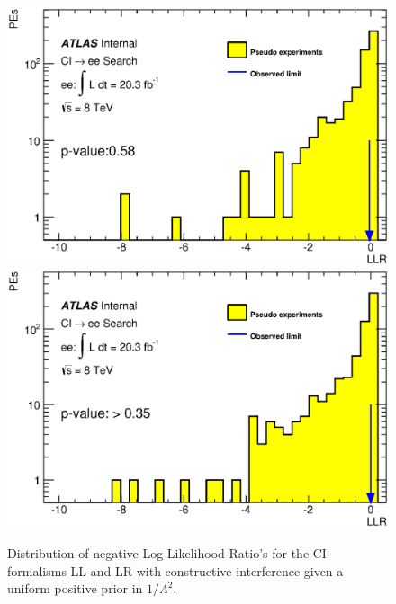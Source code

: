 
    \begin{figure}[h]
        \begin{center}
            \includegraphics[scale=0.4]{images/ee__LL_minus_L2/LLR.eps}
            \includegraphics[scale=0.4]{images/ee__LR_minus_L2/LLR.eps}
        \end{center}
       \caption{Distribution of negative Log Likelihood Ratio's for the CI formalisms LL and LR with constructive interference given a uniform positive prior in $1/\Lambda^{2}$.}
       \label{fig:LLR_CI_main}
    \end{figure}



